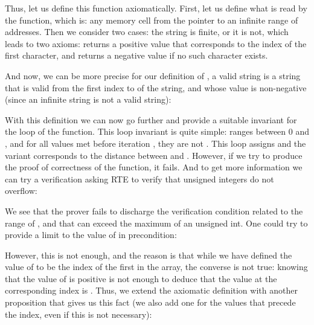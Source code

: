 Thus, let us define this function axiomatically. First, let us define what
is read by the function, which is: any memory cell from the pointer to an
infinite range of addresses. Then we consider two cases: the string is
finite, or it is not, which leads to two axioms:  returns
a positive value that corresponds to the index of the first
 character, and returns a negative value if
no such character exists.




And now, we can be more precise for our definition of
, a valid string is a
string that is valid from the first index to 
of the string, and whose value is non-negative (since an
infinite string is not a valid string):




With this definition we can now go further and provide a suitable
invariant for the loop of the  function. This loop invariant is quite
simple:  ranges between 0 and , and for
all values met before iteration , they are not
. This loop assigns  and
the variant corresponds to the distance between  and
. However, if we try to produce the proof of
correctness of the function, it fails. And to get more information
we can try a verification asking RTE to verify that unsigned
integers do not overflow:




We see that the prover fails to discharge the verification condition
related to the range of , and that
 can exceed the maximum of an unsigned int. One could try
to provide a limit to the value of  in precondition:




However, this is not enough, and the reason is that while we have defined
the value of  to be the index of
the first  in the array, the converse is
not true: knowing that the value of  is positive
is not enough to deduce that the value at the corresponding index is
. Thus, we extend the axiomatic definition
with another proposition that gives us this fact (we also add one for the
values that precede the  index, even if this is
not necessary):


